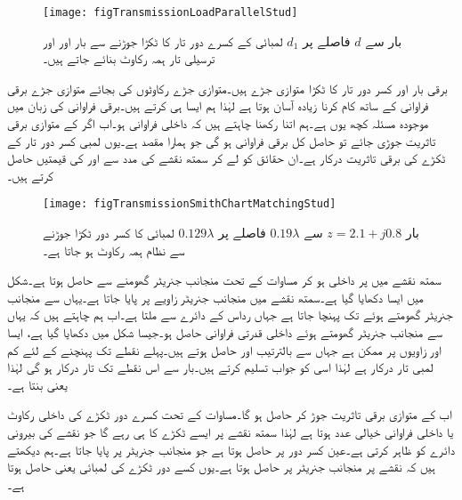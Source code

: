 \begin{figure}
\centering
\texttt{[image: figTransmissionLoadParallelStud]}
\caption{بار سے $d$ فاصلے پر $d_1$ لمبائی کے کسرے دور تار کا ٹکڑا جوڑنے سے بار اور اور ترسیلی تار ہمہ رکاوٹ بنائے جاتے ہیں۔}
\label{شکل_ترسیلی_ہمہ_رکاوٹی_بمدد_ٹکڑا_تار}
\end{figure}

برقی بار اور کسر دور تار کا ٹکڑا متوازی جڑے ہیں۔متوازی جڑے رکاوٹوں کی بجائے متوازی جڑے برقی فراوانی کے ساتھ کام کرنا زیادہ آسان ہوتا ہے لہٰذا ہم ایسا ہی کرتے ہیں۔برقی فراوانی کی زبان میں موجودہ مسئلہ کچھ یوں ہے۔ہم  اتنا رکھنا چاہتے ہیں کہ داخلی فراوانی  ہو۔اب اگر  کے متوازی  برقی تاثریت جوڑی جائے تو حاصل کل برقی فراوانی  ہو گی جو ہمارا مقصد ہے۔یوں  لمبی کسر دور تار کے ٹکڑے کی برقی تاثریت  درکار ہے۔ان حقائق کو لے کر سمتھ نقشے کی مدد سے  اور  کی قیمتیں حاصل کرتے ہیں۔

\begin{figure}
\centering
\texttt{[image: figTransmissionSmithChartMatchingStud]}
\caption{بار $z=2.1+j0.8$ سے $0.19\lambda$ فاصلے پر $0.129\lambda$ لمبائی کا کسر دور ٹکڑا جوڑنے سے نظام ہمہ رکاوٹ ہو جاتا ہے۔}
\label{شکل_ترسیلی_ہمہ_رکاوٹی_ٹکڑے_کا_نقشہ}
\end{figure}

سمتھ نقشے میں  پر داخلی ہو کر مساوات  کے تحت منجانب جنریٹر  گھومنے سے  حاصل ہوتا ہے۔شکل  میں ایسا دکھایا گیا ہے۔سمتھ نقشے میں  منجانب جنریٹر  زاویے پر پایا جاتا ہے۔یہاں سے منجانب جنریٹر  گھومتے ہوئے  تک پہنچا جاتا ہے جہاں  رداس کے دائرے سے  ملتا ہے۔اب ہم چاہتے ہیں کہ یہاں سے  منجانب جنریٹر  گھومتے ہوئے  داخلی قدرتی فراوانی  حاصل ہو۔جیسا شکل میں دکھایا گیا ہے، ایسا  اور  زاویوں پر ممکن ہے جہاں سے بالترتیب  اور   حاصل ہوتے ہیں۔پہلے نقطے تک پہنچنے کے لئے کم لمبی تار درکار ہے لہٰذا اسی کو جواب تسلیم کرتے ہیں۔بار سے اس نقطے تک  تار درکار ہو گی لہٰذا  یعنی  بنتا ہے۔

 اب  کے متوازی  برقی تاثریت جوڑ کر  حاصل ہو گا۔مساوات  کے تحت کسرے دور ٹکڑے کی داخلی رکاوٹ یا داخلی فراوانی خیالی عدد ہوتا ہے لہٰذا سمتھ نقشے پر ایسے ٹکڑے کا  ہی رہے گا جو نقشے کی بیرونی دائرے کو ظاہر کرتی ہے۔عین کسر دور پر  حاصل ہوتا ہے جو منجانب جنریٹر   پر پایا جاتا ہے۔ہم دیکھتے ہیں کہ  نقشے پر منجانب جنریٹر  پر حاصل ہوتا ہے۔یوں کسے دور ٹکڑے کی لمبائی  یعنی  حاصل ہوتا ہے۔   


